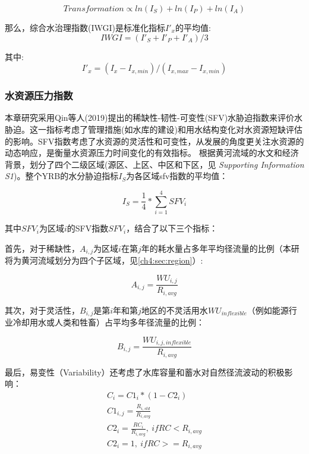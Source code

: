 \begin{equation}
    Transformation \propto ln(I_S) + ln(I_P) + ln(I_A)
\end{equation}

那么，综合水治理指数(IWGI)是标准化指标$I'_x$的平均值:
\begin{equation}
    IWGI = (I'_S + I'_P + I'_A) / 3
\end{equation}

其中:
\begin{equation}
    I'_x = (I_x - I_{x, min}) / (I_{x, max} - I_{x, min})
\end{equation}

\subsubsection*{水资源压力指数}

本章研究采用Qin等人(2019)提出的稀缺性-韧性-可变性(SFV)水胁迫指数来评价水胁迫\cite{qin2019}。这一指标考虑了管理措施(如水库的建设)和用水结构变化对水资源短缺评估的影响。SFV指数考虑了水资源的灵活性和可变性，从发展的角度更关注水资源的动态响应，是衡量水资源压力\cite{qin2019}时间变化的有效指标。
根据黄河流域的水文和经济背景，划分了四个二级区域(源区、上区、中区和下区，见\textit{ Supporting  Information S1})。整个YRB的水分胁迫指标$I_S$为各区域sfv指数的平均值：

\begin{equation}
    I_S = \frac{1}{4} * \sum_{i=1}^4 SFV_{i}
\end{equation}

其中$SFV_i$为区域$i$的SFV指数$SFV_i$，结合了以下三个指标：

首先，对于稀缺性，$A_{i, j}$为区域$i$在第$j$年的耗水量占多年平均径流量的比例（本研将为黄河流域划分为四个子区域，见\ref{ch4:sec:region}）:

\begin{equation}
    A_{i, j} = \frac{WU_{i,j}}{R_{i, avg}}
\end{equation}

其次，对于灵活性，$B_{i, j}$是第$i$年和第$j$地区的不灵活用水$WU_{inflexible}$（例如能源行业冷却用水或人类和牲畜）占平均多年径流量的比例：

\begin{equation}
    B_{i, j} = \frac{WU_{i, j, inflexible}}{R_{i, avg}}
\end{equation}

最后，易变性（Variability）还考虑了水库容量和蓄水对自然径流波动的积极影响：
\begin{gather}
    C_i = C1_i * (1 - C2_i) \\
    C1_{i, j} = \frac{R_{i, std}}{R_{i, avg}} \\
    C2_{i} = \frac{RC_{i}}{R_{i, avg}}, \ if RC < R_{i, avg} \\
    C2_{i} = 1, \ if RC >= R_{i, avg}
\end{gather}

